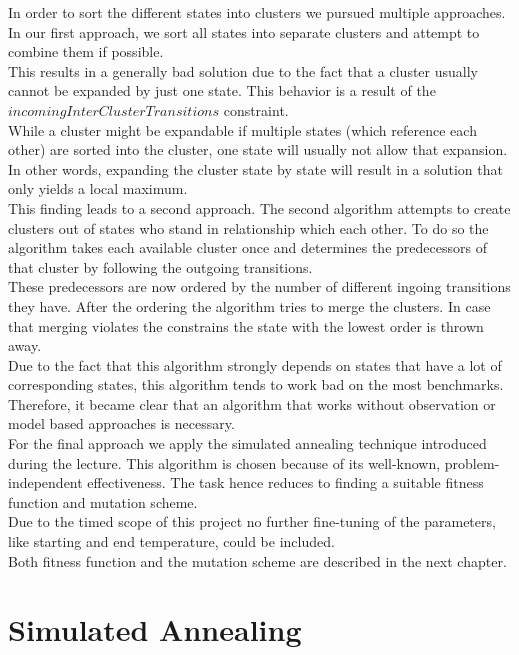 In order to sort the different states into clusters we pursued multiple approaches.
In our first approach, we sort all states into separate clusters and attempt to combine them if possible. \\
This results in a generally bad solution due to the fact that a cluster usually cannot be expanded by just one state. This behavior is a result of the $ incomingInterClusterTransitions $ constraint. \\
While a cluster might be expandable if multiple states (which reference each other) are sorted into the cluster, one state will usually not allow that expansion. \\
In other words, expanding the cluster state by state will result in a solution that only yields a local maximum.\\
This finding leads to a second approach. The second algorithm attempts to create clusters out of states who stand in relationship which each other. To do so the algorithm takes each available cluster once and determines the predecessors of that cluster by following the outgoing transitions. \\
These predecessors are now ordered by the number of different ingoing transitions they have. After the ordering the algorithm tries to merge the clusters. In case that merging violates the constrains the state with the lowest order is thrown away. \\
Due to the fact that this algorithm strongly depends on states that have a lot of corresponding states, this algorithm tends to work bad on the most benchmarks. Therefore, it became clear that an algorithm that works without observation or model based approaches is necessary. \\

For the final approach we apply the simulated annealing technique introduced during the lecture. This algorithm is chosen because of its well-known, problem-independent effectiveness. The task hence reduces to finding a suitable fitness function and mutation scheme.\\
Due to the timed scope of this project no further fine-tuning of the parameters, like starting and end temperature, could be included. \\
Both fitness function and the mutation scheme are described in the next chapter.\\



\chapter{Simulated Annealing}
\label{cha:SimulateAnnealing}

